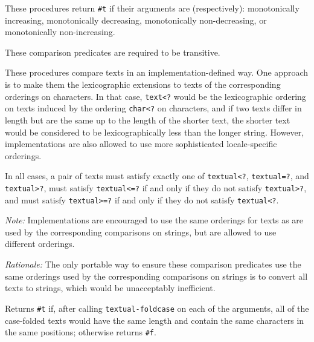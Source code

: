 \begin{entry}{%
  }

  These procedures return
  \texttt{\#t} if their arguments are (respectively): monotonically
  increasing, monotonically decreasing, monotonically non-decreasing,
  or monotonically non-increasing.

  These comparison predicates are required to be transitive.

  These procedures compare texts in an implementation-defined way. One
  approach is to make them the lexicographic extensions to texts of
  the corresponding orderings on characters. In that case,
  \texttt{text<?} would be the lexicographic ordering on
  texts induced by the ordering \texttt{char<?} on
  characters, and if two texts differ in length but are the same up to
  the length of the shorter text, the shorter text would be considered
  to be lexicographically less than the longer string. However,
  implementations are also allowed to use more sophisticated
  locale-specific orderings.

  In all cases, a pair of texts must satisfy exactly one of
  \texttt{textual<?}, \texttt{textual=?}, and
  \texttt{textual>?}, must satisfy
  \texttt{textual<=?} if and only if they do not satisfy
  \texttt{textual>?}, and must satisfy
  \texttt{textual>=?} if and only if they do not satisfy
  \texttt{textual<?}.

  \emph{Note:} Implementations are encouraged to use the same
  orderings for texts as are used by the corresponding comparisons on
  strings, but are allowed to use different orderings.

  \emph{Rationale:} The only portable way to ensure these comparison
  predicates use the same orderings used by the corresponding
  comparisons on strings is to convert all texts to strings, which
  would be unacceptably inefficient.
\end{entry}

\begin{entry}{%
  }

  Returns \texttt{\#t} if, after calling
  \texttt{textual-foldcase} on each of the arguments, all of the
  case-folded texts would have the same length and contain the same
  characters in the same positions; otherwise returns \texttt{\#f}.
\end{entry}

